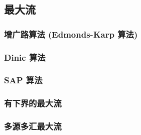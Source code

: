 \subsection{最大流}
    \subsubsection{增广路算法 (Edmonds-Karp 算法)}
    \subsubsection{Dinic 算法}
    \subsubsection{SAP 算法}
	\subsubsection{有下界的最大流}
	\subsubsection{多源多汇最大流}